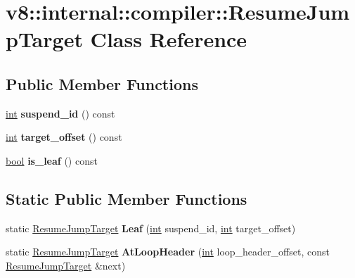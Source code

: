 \hypertarget{classv8_1_1internal_1_1compiler_1_1ResumeJumpTarget}{}\section{v8\+:\+:internal\+:\+:compiler\+:\+:Resume\+Jump\+Target Class Reference}
\label{classv8_1_1internal_1_1compiler_1_1ResumeJumpTarget}
\subsection*{Public Member Functions}
\begin{DoxyCompactItemize}
\item 
\mbox{\label{classv8_1_1internal_1_1compiler_1_1ResumeJumpTarget_a1ec4e884427d248ba65c26f31b71a7a8}} 
\mbox{\hyperlink{classint}{int}} {\bfseries suspend\+\_\+id} () const
\item 
\mbox{\label{classv8_1_1internal_1_1compiler_1_1ResumeJumpTarget_ae766d6c491d5b1a33f02588e28d195d8}} 
\mbox{\hyperlink{classint}{int}} {\bfseries target\+\_\+offset} () const
\item 
\mbox{\label{classv8_1_1internal_1_1compiler_1_1ResumeJumpTarget_aea3ec050fd494d01d8b9a0e110480874}} 
\mbox{\hyperlink{classbool}{bool}} {\bfseries is\+\_\+leaf} () const
\end{DoxyCompactItemize}
\subsection*{Static Public Member Functions}
\begin{DoxyCompactItemize}
\item 
\mbox{\label{classv8_1_1internal_1_1compiler_1_1ResumeJumpTarget_a986bf289a514b60d3f0aff892db0f269}} 
static \mbox{\hyperlink{classv8_1_1internal_1_1compiler_1_1ResumeJumpTarget}{Resume\+Jump\+Target}} {\bfseries Leaf} (\mbox{\hyperlink{classint}{int}} suspend\+\_\+id, \mbox{\hyperlink{classint}{int}} target\+\_\+offset)
\item 
\mbox{\label{classv8_1_1internal_1_1compiler_1_1ResumeJumpTarget_ab9b8e3d5cd5a1575adb6e28118ad2930}} 
static \mbox{\hyperlink{classv8_1_1internal_1_1compiler_1_1ResumeJumpTarget}{Resume\+Jump\+Target}} {\bfseries At\+Loop\+Header} (\mbox{\hyperlink{classint}{int}} loop\+\_\+header\+\_\+offset, const \mbox{\hyperlink{classv8_1_1internal_1_1compiler_1_1ResumeJumpTarget}{Resume\+Jump\+Target}} \&next)
\end{DoxyCompactItemize}


